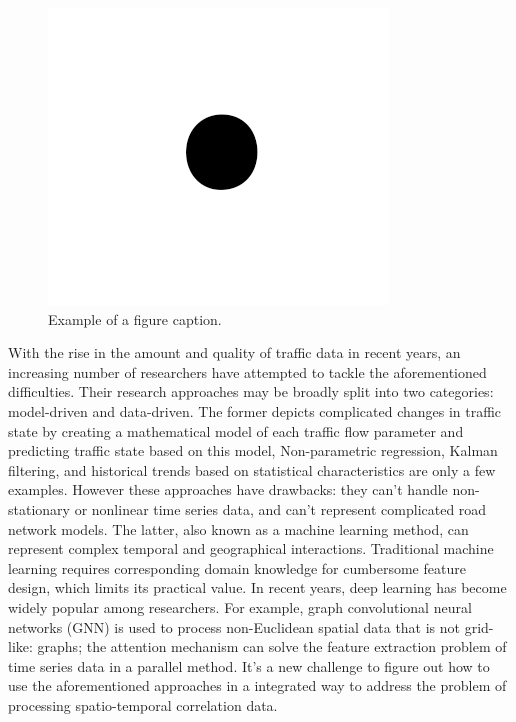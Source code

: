 \documentclass[conference]{IEEEtran}
\begin{document}
\begin{figure}[htbp]
    \centerline{\includegraphics{fig1.png}}
    \caption{Example of a figure caption.}
    \label{fig1}
\end{figure}
\par
With the rise in the amount and quality of traffic data in recent years, an increasing number of researchers have attempted to tackle the aforementioned difficulties. Their research approaches may be broadly split into two categories: model-driven and data-driven. The former depicts complicated changes in traffic state by creating a mathematical model of each traffic flow parameter and predicting traffic state based on this model, Non-parametric regression, Kalman filtering, and historical trends based on statistical characteristics are only a few examples. However these approaches have drawbacks: they can't handle non-stationary or nonlinear time series data, and can't represent complicated road network models. The latter, also known as a machine learning method, can represent complex temporal and geographical interactions. Traditional machine learning requires corresponding domain knowledge for cumbersome feature design, which limits its practical value. In recent years, deep learning has become widely popular among researchers. For example, %
graph convolutional neural networks (GNN) is used to process non-Euclidean spatial data that is not grid-like: graphs; the attention mechanism can solve the feature extraction problem of time series data in a parallel method. It's a new challenge to figure out how to use the aforementioned approaches in a integrated way to address the problem of processing spatio-temporal correlation data.
\end{document}
